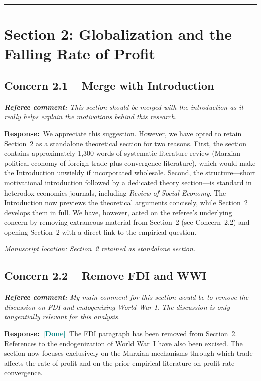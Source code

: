 \documentclass[11pt]{article}
\newcommand{\RC}[1]{\begin{refereebox}\textit{\textbf{Referee comment:} #1}\end{refereebox}}
\newcommand{\AR}{\noindent\textbf{Response:}\ }
\newcommand{\done}{\textcolor{teal}{\textbf{[Done]}}}
\begin{document}
\bigskip\noindent\rule{\textwidth}{0.4pt}\bigskip

\section*{Section 2: Globalization and the Falling Rate of Profit}

\subsection*{Concern 2.1 -- Merge with Introduction}

\RC{This section should be merged with the introduction as it really helps explain the motivations behind this research.}

\AR We appreciate this suggestion. However, we have opted to retain Section~2 as a standalone theoretical section for two reasons. First, the section contains approximately 1,300 words of systematic literature review (Marxian political economy of foreign trade plus convergence literature), which would make the Introduction unwieldy if incorporated wholesale. Second, the structure---short motivational introduction followed by a dedicated theory section---is standard in heterodox economics journals, including \textit{Review of Social Economy}. The Introduction now previews the theoretical arguments concisely, while Section~2 develops them in full. We have, however, acted on the referee's underlying concern by removing extraneous material from Section~2 (see Concern~2.2) and opening Section~2 with a direct link to the empirical question.

\smallskip\noindent\textit{Manuscript location: Section~2 retained as standalone section.}

\subsection*{Concern 2.2 -- Remove FDI and WWI}

\RC{My main comment for this section would be to remove the discussion on FDI and endogenizing World War I. The discussion is only tangentially relevant for this analysis.}

\AR \done\ The FDI paragraph has been removed from Section~2. References to the endogenization of World War~I have also been excised. The section now focuses exclusively on the Marxian mechanisms through which trade affects the rate of profit and on the prior empirical literature on profit rate convergence.
\end{document}
